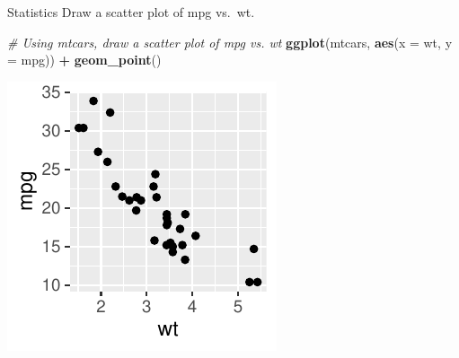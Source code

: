 \documentclass[
  ignorenonframetext,
]{beamer}
\newenvironment{Shaded}{\begin{snugshade}}{\end{snugshade}}
\newcommand{\AttributeTok}[1]{\textcolor[rgb]{0.13,0.29,0.53}{#1}}
\newcommand{\CommentTok}[1]{\textcolor[rgb]{0.56,0.35,0.01}{\textit{#1}}}
\newcommand{\FunctionTok}[1]{\textcolor[rgb]{0.13,0.29,0.53}{\textbf{#1}}}
\newcommand{\NormalTok}[1]{#1}
\newcommand{\SpecialCharTok}[1]{\textcolor[rgb]{0.81,0.36,0.00}{\textbf{#1}}}
\begin{document}
\begin{frame}[fragile]{Statistics}
\label{statistics-5}
Draw a scatter plot of mpg vs.~wt.


\begin{Shaded}
\begin{Highlighting}[]
\CommentTok{\# Using mtcars, draw a scatter plot of mpg vs. wt}
\FunctionTok{ggplot}\NormalTok{(mtcars, }\FunctionTok{aes}\NormalTok{(}\AttributeTok{x =}\NormalTok{ wt, }\AttributeTok{y =}\NormalTok{ mpg)) }\SpecialCharTok{+} \FunctionTok{geom\_point}\NormalTok{()}
\end{Highlighting}
\end{Shaded}

\begin{center}\includegraphics[width=0.5\linewidth]{Figs/unnamed-chunk-2-1} \end{center}
\end{frame}
\end{document}
